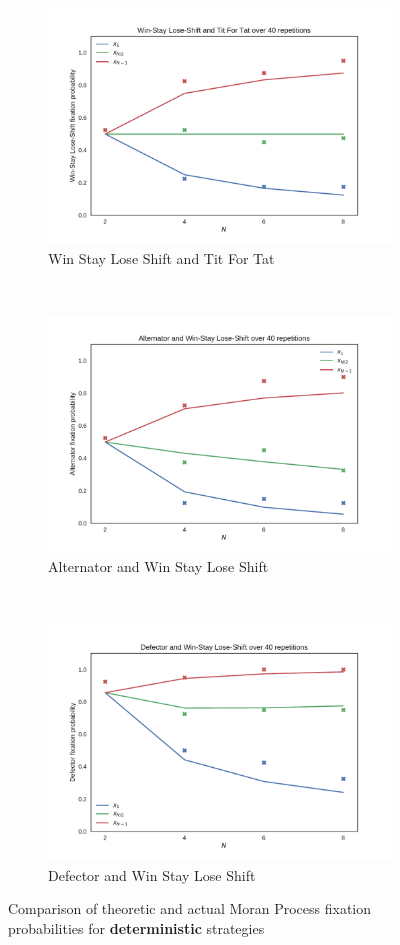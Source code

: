\documentclass{article}
\begin{document}
\begin{figure}[!hbtp]
    \begin{subfigure}[t]{.3\textwidth}
        \centering
        \includegraphics[width=.8\textwidth]{../img/Win-Stay_Lose-Shift_v_Tit_For_Tat.pdf}
        \caption{Win Stay Lose Shift and Tit For Tat}
    \end{subfigure}%
    ~
    \begin{subfigure}[t]{.3\textwidth}
        \centering
        \includegraphics[width=.8\textwidth]{../img/Alternator_v_Win-Stay_Lose-Shift.pdf}
        \caption{Alternator and Win Stay Lose Shift}
    \end{subfigure}%
    ~
    \begin{subfigure}[t]{.3\textwidth}
        \centering
        \includegraphics[width=.8\textwidth]{../img/Defector_v_Win-Stay_Lose-Shift.pdf}
        \caption{Defector and Win Stay Lose Shift}
    \end{subfigure}%
    \caption{Comparison of theoretic and actual Moran Process fixation
             probabilities for \textbf{deterministic} strategies}
    \label{fig:comparison_deterministic}
\end{figure}
\end{document}
